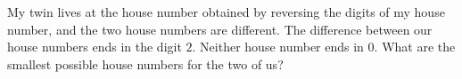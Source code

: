 My twin lives at the house number obtained by reversing the digits of my house number, and the two house numbers are different. The difference between our house numbers ends in the digit $2$. Neither house number ends in $0$. What are the smallest possible house numbers for the two of us?
